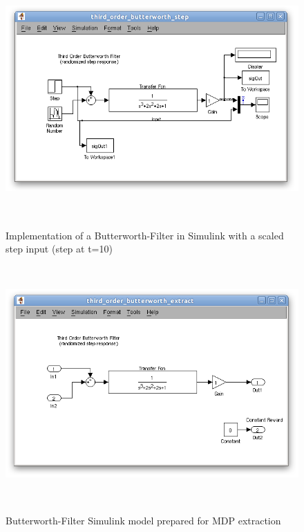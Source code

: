\begin{figure}
\begin{center}
\includegraphics[height=9cm]{media/bw/bw_step_mdl}\\
\end{center}
\caption{Implementation of a Butterworth-Filter in Simulink with a scaled step input (step at t=10)}
\label{bw_step_mdl}
\end{figure}

\begin{figure}
\begin{center}
\includegraphics[height=9cm]{media/bw/bw_extract_mdl}\\
\end{center}
\caption{Butterworth-Filter Simulink model prepared for MDP extraction}
\label{bw_extract_mdl}
\end{figure}

